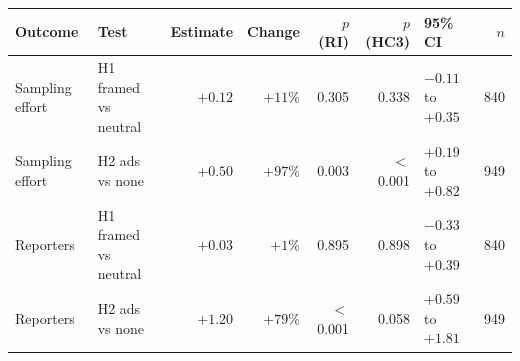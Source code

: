\begin{tabular}{llrrrrlr}
\toprule
Outcome & Test & Estimate & Change & $p$ (RI) & $p$ (HC3) & 95\% CI & $n$ \\
\midrule
Sampling effort & H1 framed vs neutral & $+0.12$ & $+11$\% & 0.305 & 0.338 & $-0.11$ to $+0.35$ & 840 \\
Sampling effort & H2 ads vs none & $+0.50$ & $+97$\% & 0.003 & $<$0.001 & $+0.19$ to $+0.82$ & 949 \\
Reporters & H1 framed vs neutral & $+0.03$ & $+1$\% & 0.895 & 0.898 & $-0.33$ to $+0.39$ & 840 \\
Reporters & H2 ads vs none & $+1.20$ & $+79$\% & $<$0.001 & 0.058 & $+0.59$ to $+1.81$ & 949 \\
\bottomrule
\end{tabular}
